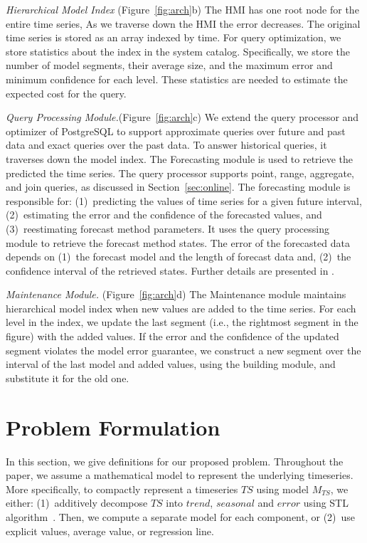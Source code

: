 \documentclass[10pt,conference,letterpaper]{IEEEtran}
\newcommand{\LNs}{hierarchical model index }
\newcommand{\HMI}{Hierarchical Model Index }
\begin{document}
{\em \HMI} (Figure~\ref{fig:arch}b)
The HMI has one root node for the entire time series, As we traverse down the HMI the error decreases. 
 The original time series is stored as an array indexed by time.
For query optimization, we store statistics about the index in the system catalog. Specifically, we store the number of model segments, their average size, and the maximum error and minimum confidence for each level. These statistics are needed to estimate the expected cost for the query.

{\em Query Processing Module.}(Figure~\ref{fig:arch}c) We extend the query processor and optimizer of PostgreSQL to support approximate queries over future and past data and exact queries over the past data. 
To answer historical queries, it traverses down the model index. The Forecasting module is used to retrieve the predicted the time series.
The query processor supports point, range, aggregate, and join queries, as discussed in Section~\ref{sec:online}. 
 The forecasting module is responsible for: (1)~predicting the values of time series for a given future interval, (2)~estimating the error and the confidence of the 
forecasted values, and (3)~reestimating forecast method parameters. It uses the query processing module to retrieve the forecast method states. The error of the forecasted data~\cite{tBOX76a} depends on (1)~the forecast model and the length of forecast data and, (2)~the confidence interval of the retrieved states. Further details are presented in \cite{FRL12}.


{\em Maintenance Module.} (Figure~\ref{fig:arch}d)
The Maintenance module maintains \LNs  when new values are added to the time series.
For each level in the index,  we update the last segment (i.e., the rightmost segment in the figure) with the added values. 
If the error and the confidence of the updated segment violates the model error guarantee, we construct a new segment over the interval of the last model and added values, using the building module, and substitute it for the old one. 




\section{Problem Formulation}
\label{sec:form}
In this section, we give  definitions for our proposed problem. Throughout the paper, we assume a mathematical model to  represent the underlying timeseries. More specifically, to compactly represent a timeseries $TS$ using model  $M_{TS}$, we either: (1)~additively decompose $TS$ into $trend$, $seasonal$ and $error$ using STL algorithm~\cite{STL}. Then, we compute a separate model for each component, or (2)~use explicit values, average  value, or regression line. %
\end{document}
